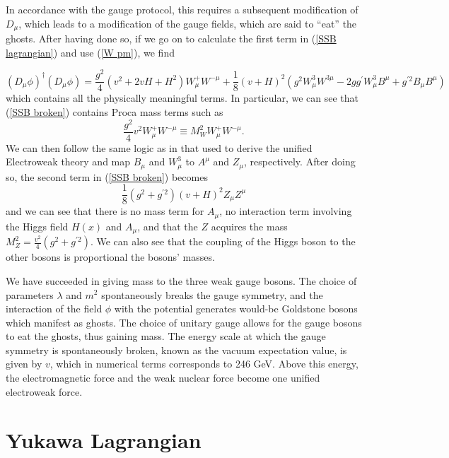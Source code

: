 \documentclass[10pt,a4paper]{book}
\begin{document}
In accordance with the gauge protocol, this requires a subsequent modification of $D_\mu$, which leads to a modification of the gauge fields, which are said to ``eat'' the ghosts. After having done so, if we go on to calculate the first term in (\ref{SSB lagrangian}) and use (\ref{W pm}), we find

\begin{equation}
\label{SSB broken}
(D_\mu\phi)^\dagger(D_\mu\phi) = \frac{g^2}{4}\left(v^2 + 2vH + H^2\right)W^+_\mu W^{- \mu} + \frac{1}{8}(v + H)^2 \left( g^2 W^3_\mu W^{3\mu} - 2gg^\prime W^3_\mu B^\mu + g^{\prime 2}B_\mu B^\mu \right)
\end{equation}
which contains all the physically meaningful terms. In particular, we can see that (\ref{SSB broken}) contains Proca mass terms such as 
\begin{equation}
\frac{g^2}{4}v^2 W_\mu^+ W^{-\mu} \equiv M^2_W W_\mu^+ W^{-\mu}.
\end{equation}
We can then follow the same logic as in that used to derive the unified Electroweak theory and map $B_\mu$ and $W^3_\mu$ to $A^\mu$ and $Z_\mu$, respectively. After doing so, the second term in (\ref{SSB broken}) becomes
\begin{equation}
\frac{1}{8}(g^2 + g^{\prime 2})(v + H)^2 Z_\mu Z^\mu
\end{equation}
and we can see that there is no mass term for $A_\mu$, no interaction term involving the Higgs field $H(x)$ and $A_\mu$, and that the $Z$ acquires the mass $M^2_Z = \frac{v^2}{4}(g^2 + g^{\prime 2})$. We can also see that the coupling of the Higgs boson to the other bosons is proportional the bosons' masses. 

We have succeeded in giving mass to the three weak gauge bosons. The choice of parameters $\lambda$ and $m^2$ spontaneously breaks the gauge symmetry, and the interaction of the field $\phi$ with the potential generates would-be Goldstone bosons which manifest as ghosts. The choice of unitary gauge allows for the gauge bosons to eat the ghosts, thus gaining mass. The energy scale at which the gauge symmetry is spontaneously broken, known as the vacuum expectation value, is given by $v$, which in numerical terms corresponds to 246 GeV. Above this energy, the electromagnetic force and the weak nuclear force become one unified electroweak force. 

\section{Yukawa Lagrangian}
\end{document}
